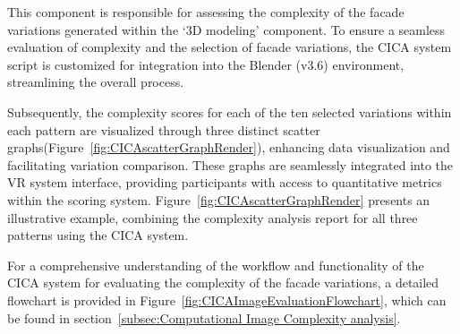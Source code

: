 %    

This component is responsible for assessing the complexity of the facade variations generated within the `3D modeling' component.
To ensure a seamless evaluation of complexity and the selection of facade variations, the CICA system script is customized for integration into the Blender (v3.6) environment, streamlining the overall process.

Subsequently, the complexity scores for each of the ten selected variations within each pattern are visualized through three distinct scatter graphs(Figure~\ref{fig:CICAscatterGraphRender}), enhancing data visualization and facilitating variation comparison.
These graphs are seamlessly integrated into the VR system interface, providing participants with access to quantitative metrics within the scoring system.
Figure~\ref{fig:CICAscatterGraphRender} presents an illustrative example, combining the complexity analysis report for all three patterns using the CICA system.

For a comprehensive understanding of the workflow and functionality of the CICA system for evaluating the complexity of the facade variations, a detailed flowchart is provided in Figure~\ref{fig:CICAImageEvaluationFlowchart}, which can be found in section~\ref{subsec:Computational Image Complexity analysis}.

